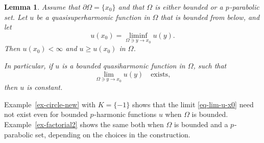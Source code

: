 \documentclass[a4paper,twoside]{article}
\theoremstyle{propositional}
\newtheorem{lem}[thm]{Lemma}
\theoremstyle{descriptive}
\theoremstyle{remarkstyle}
\newcommand{\bdry}{\partial}
\newcommand{\bdy}{\bdry}
\newcommand{\Om}{\Omega}
\newcommand{\p}{{$p\mspace{1mu}$}}
\numberwithin{equation}{section}
\begin{document}
\begin{lem}   \label{lem-quasi-Liouville-Om}
Assume that $\bdy\Om = \{x_0\}$ and that $\Om$ is either
bounded or a \p-parabolic set.
Let $u$ be a 
quasisuperharmonic function in $\Om$ that is bounded from below,
and let
\begin{equation}   \label{eq-def-u-x0}
u(x_0)=\liminf_{\Om\ni y\to x_0} u(y).
\end{equation}
Then $u(x_0)<\infty$ and $u\ge u(x_0)$ in $\Om$.

In particular, if $u$ is a bounded quasiharmonic function in $\Om$, such that 
\begin{equation}   \label{eq-lim-u-x0}
\lim_{\Om\ni y\to x_0} u(y)\quad \text{exists},
\end{equation}
then $u$ is constant.
\end{lem}

Example~\ref{ex-circle-new} with $K=\{-1\}$ 
shows that the limit \eqref{eq-lim-u-x0}
need not exist even for 
bounded \p-harmonic functions $u$ when $\Om$ is bounded.
Example~\ref{ex-factorial2} shows the same both when
$\Om$ is bounded and a \p-parabolic set, depending on the choices in the construction.
\end{document}
